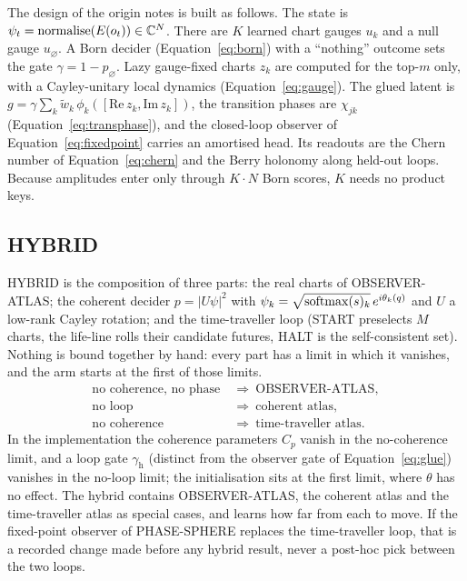 The design of the origin notes is built as follows. The state is $\psi_t=\mathrm{normalise}(E(o_t))\in\mathbb{C}^N$. There are $K$ learned chart gauges $u_k$ and a null gauge $u_\varnothing$. A Born decider (Equation~\eqref{eq:born}) with a ``nothing'' outcome sets the gate $\gamma=1-p_\varnothing$. Lazy gauge-fixed charts $z_k$ are computed for the top-$m$ only, with a Cayley-unitary local dynamics (Equation~\eqref{eq:gauge}). The glued latent is $g=\gamma\sum_k\tilde w_k\,\phi_k([\mathrm{Re}\,z_k,\mathrm{Im}\,z_k])$, the transition phases are $\chi_{jk}$ (Equation~\eqref{eq:transphase}), and the closed-loop observer of Equation~\eqref{eq:fixedpoint} carries an amortised head. Its readouts are the Chern number of Equation~\eqref{eq:chern} and the Berry holonomy along held-out loops. Because amplitudes enter only through $K\cdot N$ Born scores, $K$ needs no product keys.

\subsection{HYBRID}

HYBRID is the composition of three parts: the real charts of OBSERVER-ATLAS; the coherent decider $p=\lvert U\psi\rvert^2$ with $\psi_k=\sqrt{\operatorname{softmax}(s)_k}\,e^{i\theta_k(q)}$ and $U$ a low-rank Cayley rotation; and the time-traveller loop (START preselects $M$ charts, the life-line rolls their candidate futures, HALT is the self-consistent set). Nothing is bound together by hand: every part has a limit in which it vanishes, and the arm starts at the first of those limits. \begin{equation}\label{eq:hybridlimits}
  \begin{aligned}
    \text{no coherence, no phase}&\ \Rightarrow\ \text{OBSERVER-ATLAS},\\
    \text{no loop}&\ \Rightarrow\ \text{coherent atlas},\\
    \text{no coherence}&\ \Rightarrow\ \text{time-traveller atlas}.
  \end{aligned}
\end{equation}
In the implementation the coherence parameters $C_p$ vanish in the no-coherence limit, and a loop gate $\gamma_{\mathrm h}$ (distinct from the observer gate of Equation~\eqref{eq:glue}) vanishes in the no-loop limit; the initialisation sits at the first limit, where $\theta$ has no effect. The hybrid contains OBSERVER-ATLAS, the coherent atlas and the time-traveller atlas as special cases, and learns how far from each to move. If the fixed-point observer of PHASE-SPHERE replaces the time-traveller loop, that is a recorded change made before any hybrid result, never a post-hoc pick between the two loops.

